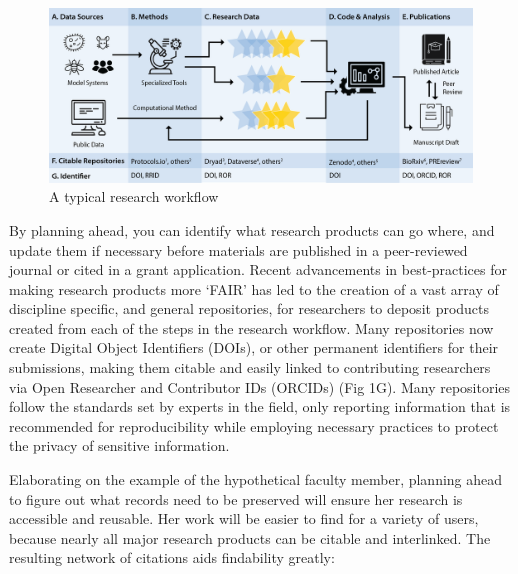\documentclass[10pt,letterpaper]{article}
\begin{document}
\begin{figure}
  \includegraphics[width=\textwidth]{workflow.png}
  \captionsetup{justification=centering}
  \caption{A typical research workflow}
  \label{workflow}
\end{figure}

By planning ahead, you can identify what research products can go where, and
update them if necessary before materials are published in a peer-reviewed
journal or cited in a grant application. Recent advancements in best-practices
for making research products more `FAIR' has led to the creation of a vast array
of discipline specific, and general repositories\cite{PLOS2020}, for researchers
to deposit products created from each of the steps in the research workflow.
Many repositories now create Digital Object Identifiers (DOIs)\cite{DOI2020}, or
other permanent identifiers for their submissions, making them citable and
easily linked to contributing researchers via Open Researcher and Contributor
IDs (ORCIDs)\cite{ORCID2020} (Fig 1G). Many repositories follow the standards
set by experts in the field, only reporting information that is recommended for
reproducibility while employing necessary practices to protect the privacy of
sensitive information.

Elaborating on the example of the hypothetical faculty member, planning ahead to
figure out what records need to be preserved will ensure her research is
accessible and reusable. Her work will be easier to find for a variety of
users, because nearly all major research products can be citable and
interlinked. The resulting network of citations aids findability greatly:
\end{document}
